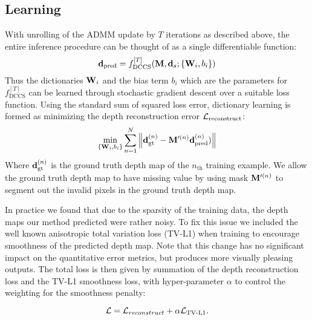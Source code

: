 
\subsection{Learning}
\label{sec:dictionary-learning}

With unrolling of the ADMM update by $T$ iterations as described above, the entire inference procedure can be thought of as a single differentiable function:
\begin{equation}
    \mathbf{d}_\text{pred} = f_\text{DCCS}^{[T]}(\mathbf{M}, \mathbf{d}_s; \{\mathbf{W}_i, b_i\})
\end{equation}
Thus the dictionaries $\mathbf{W}_i$ and the bias term $b_i$ which are the parameters for $f_\text{DCCS}^{[T]}$ can be learned through  stochastic gradient descent over a suitable loss function. Using the standard sum of squared loss error, dictionary learning is formed as minimizing the depth reconstruction error $\mathcal{L}_\text{reconstruct}$:
\begin{equation}
  \label{eq:9}
  \min_{\{\mathbf{W}_i, b_i\}} \sum_{n=1}^{N}\left\Vert \mathbf{d}_\text{gt}^{(n)} - \mathbf{M}'^{(n)}  \mathbf{d}_\text{pred}^{(n)})\right\Vert
\end{equation}
Where $\mathbf{d}_\text{gt}^{(n)}$ is the ground truth depth map of the $n_\text{th}$ training example. We allow the ground truth depth map to have missing value by using mask $\mathbf{M}'^{(n)}$ to segment out the invalid pixels in the ground truth depth map. 

In practice we found that due to the sparsity of the training data, the depth maps our method predicted were rather noisy. To fix this issue we included the well known anisotropic total variation loss (TV-L1) when training to encourage smoothness of the predicted depth map. Note that this change has no significant impact on the quantitative error metrics, but produces more visually pleasing outputs. The total loss is then given by summation of the depth reconstruction loss and the TV-L1 smoothness loss, with hyper-parameter $\alpha$ to control the weighting for the smoothness penalty:

\begin{equation}
  \label{eq:9}
  \mathcal{L} = \mathcal{L}_{reconstruct} + \alpha \mathcal{L}_\text{TV-L1}.
\end{equation}

